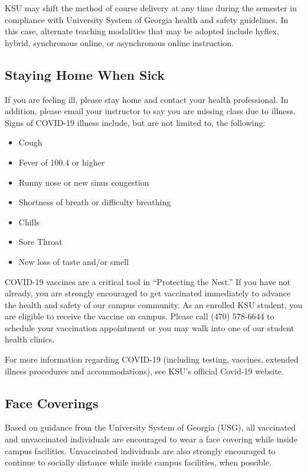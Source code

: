 \documentclass[11pt,]{article}
\providecommand{\tightlist}{%
  \setlength{\itemsep}{0pt}\setlength{\parskip}{0pt}}
\begin{document}
KSU may shift the method of course delivery at any time during the semester in compliance with University System of Georgia health and safety guidelines. In this case, alternate teaching modalities that may be adopted include hyflex, hybrid, synchronous online, or asynchronous online instruction.

\hypertarget{staying-home-when-sick}{%
\subsection{Staying Home When Sick}\label{staying-home-when-sick}}

If you are feeling ill, please stay home and contact your health professional. In addition, please email your instructor to say you are missing class due to illness. Signs of COVID-19 illness include, but are not limited to, the following:

\begin{itemize}
\tightlist
\item
  Cough
\item
  Fever of 100.4 or higher
\item
  Runny nose or new sinus congestion
\item
  Shortness of breath or difficulty breathing
\item
  Chills
\item
  Sore Throat
\item
  New loss of taste and/or smell
\end{itemize}

COVID-19 vaccines are a critical tool in ``Protecting the Nest.'' If you have not already, you are strongly encouraged to get vaccinated immediately to advance the health and safety of our campus community. As an enrolled KSU student, you are eligible to receive the vaccine on campus. Please call (470) 578-6644 to schedule your vaccination appointment or you may walk into one of our student health clinics.

For more information regarding COVID-19 (including testing, vaccines, extended illness procedures and accommodations), see KSU's official Covid-19 website.

\hypertarget{face-coverings}{%
\subsection{Face Coverings}\label{face-coverings}}

Based on guidance from the University System of Georgia (USG), all vaccinated and unvaccinated individuals are encouraged to wear a face covering while inside campus facilities. Unvaccinated individuals are also strongly encouraged to continue to socially distance while inside campus facilities, when possible.
\end{document}
